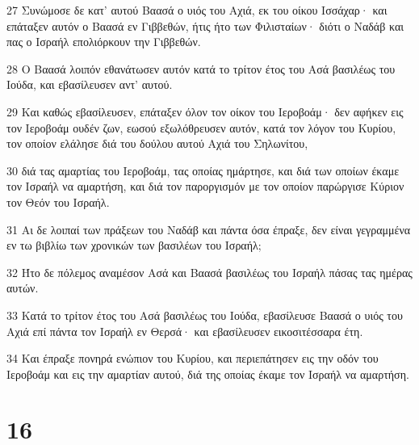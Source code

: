 \par 27 Συνώμοσε δε κατ' αυτού Βαασά ο υιός του Αχιά, εκ του οίκου Ισσάχαρ· και επάταξεν αυτόν ο Βαασά εν Γιββεθών, ήτις ήτο των Φιλισταίων· διότι ο Ναδάβ και πας ο Ισραήλ επολιόρκουν την Γιββεθών.
\par 28 Ο Βαασά λοιπόν εθανάτωσεν αυτόν κατά το τρίτον έτος του Ασά βασιλέως του Ιούδα, και εβασίλευσεν αντ' αυτού.
\par 29 Και καθώς εβασίλευσεν, επάταξεν όλον τον οίκον του Ιεροβοάμ· δεν αφήκεν εις τον Ιεροβοάμ ουδέν ζων, εωσού εξωλόθρευσεν αυτόν, κατά τον λόγον του Κυρίου, τον οποίον ελάλησε διά του δούλου αυτού Αχιά του Σηλωνίτου,
\par 30 διά τας αμαρτίας του Ιεροβοάμ, τας οποίας ημάρτησε, και διά των οποίων έκαμε τον Ισραήλ να αμαρτήση, και διά τον παροργισμόν με τον οποίον παρώργισε Κύριον τον Θεόν του Ισραήλ.
\par 31 Αι δε λοιπαί των πράξεων του Ναδάβ και πάντα όσα έπραξε, δεν είναι γεγραμμένα εν τω βιβλίω των χρονικών των βασιλέων του Ισραήλ;
\par 32 Ήτο δε πόλεμος αναμέσον Ασά και Βαασά βασιλέως του Ισραήλ πάσας τας ημέρας αυτών.
\par 33 Κατά το τρίτον έτος του Ασά βασιλέως του Ιούδα, εβασίλευσε Βαασά ο υιός του Αχιά επί πάντα τον Ισραήλ εν Θερσά· και εβασίλευσεν εικοσιτέσσαρα έτη.
\par 34 Και έπραξε πονηρά ενώπιον του Κυρίου, και περιεπάτησεν εις την οδόν του Ιεροβοάμ και εις την αμαρτίαν αυτού, διά της οποίας έκαμε τον Ισραήλ να αμαρτήση.

\chapter{16}

